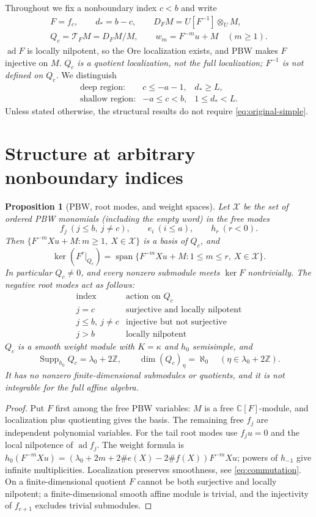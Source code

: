 \documentclass[11pt,a4paper]{article}
\theoremstyle{upright}
\newtheorem{proposition}[theorem]{Proposition}
\newcommand{\C}{\mathbb C}
\newcommand{\Z}{\mathbb Z}
\newcommand{\T}{\mathcal T}
\newcommand{\X}{\mathcal X}
\DeclareMathOperator{\ad}{ad}
\DeclareMathOperator{\Span}{span}
\DeclareMathOperator{\Supp}{Supp}
\begin{document}
Throughout we fix a nonboundary index $c<b$ and write
\[
\begin{gathered}
F=f_c,\qquad d_*=b-c,\qquad D_FM=U[F^{-1}]\otimes_U M,\\
Q_c=\T_FM=D_FM/M,\qquad w_m=F^{-m}u+M\quad(m\ge1).
\end{gathered}
\]
$\ad F$ is locally nilpotent, so the Ore localization exists, and PBW makes
$F$ injective on $M$. \emph{$Q_c$ is a quotient localization, not the full
localization; $F^{-1}$ is not defined on $Q_c$.} We distinguish
\[
\begin{array}{lll}
\text{deep region:}&c\le-a-1,&d_*\ge L,\\
\text{shallow region:}&-a\le c<b,&1\le d_*<L.
\end{array}
\]
Unless stated otherwise, the structural results do not require
\eqref{eq:original-simple}.

\section{Structure at arbitrary nonboundary indices}

\begin{proposition}[PBW, root modes, and weight spaces]\label{prop:pbw}
Let $\X$ be the set of ordered PBW monomials (including the empty word) in
the free modes
\[
f_j\ (j\le b,\ j\ne c),\qquad e_i\ (i\le a),\qquad h_r\ (r<0).
\]
Then $\{F^{-m}Xu+M:m\ge1,\ X\in\X\}$ is a basis of $Q_c$, and
\[
\ker(F^r|_{Q_c})=\Span\{F^{-m}Xu+M:1\le m\le r,\ X\in\X\}.
\]
In particular $Q_c\ne0$, and every nonzero submodule meets $\ker F$
nontrivially. The negative root modes act as follows:
\[
\begin{array}{c|c}
\text{index}&\text{action on }Q_c\\ \hline
j=c&\text{surjective and locally nilpotent}\\
j\le b,\ j\ne c&\text{injective but not surjective}\\
j>b&\text{locally nilpotent}
\end{array}
\]
$Q_c$ is a smooth weight module with $K=\kappa$ and $h_0$ semisimple, and
\[
\Supp_{h_0}Q_c=\lambda_0+2\Z,
\qquad \dim (Q_c)_\eta=\aleph_0\quad(\eta\in\lambda_0+2\Z).
\]
It has no nonzero finite-dimensional submodules or quotients, and it is not
integrable for the full affine algebra.
\end{proposition}
\begin{proof}
Put $F$ first among the free PBW variables: $M$ is a free $\C[F]$-module, and
localization plus quotienting gives the basis. The remaining free $f_j$ are
independent polynomial variables. For the tail root modes use $f_ju=0$ and
the local nilpotence of $\ad f_j$. The weight formula is
$h_0(F^{-m}Xu)=(\lambda_0+2m+2\#e(X)-2\#f(X))F^{-m}Xu$; powers of $h_{-1}$
give infinite multiplicities. Localization preserves smoothness, see
\eqref{eq:commutation}. On a finite-dimensional quotient $F$ cannot be both
surjective and locally nilpotent; a finite-dimensional smooth affine module
is trivial, and the injectivity of $f_{c+1}$ excludes trivial submodules.
\end{proof}
\end{document}

